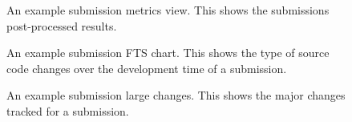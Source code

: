 \begin{figure}[H]
  \centering
  \caption[Web Submission Data]{An example submission metrics view. This shows the submissions post-processed results.}
  \label{fig:web-submission-details-data}
\end{figure}

\begin{figure}[H]
  \centering
  \caption[Web Submission FTS Chart]{An example submission FTS chart. This shows the type of source code changes over the development time of a submission.}
  \label{fig:web-submission-details-chart}
\end{figure}

\begin{figure}[H]
  \centering
  \caption[Web Submission Changes]{An example submission large changes. This shows the major changes tracked for a submission.}
  \label{fig:web-submission-details-changes}
\end{figure}

